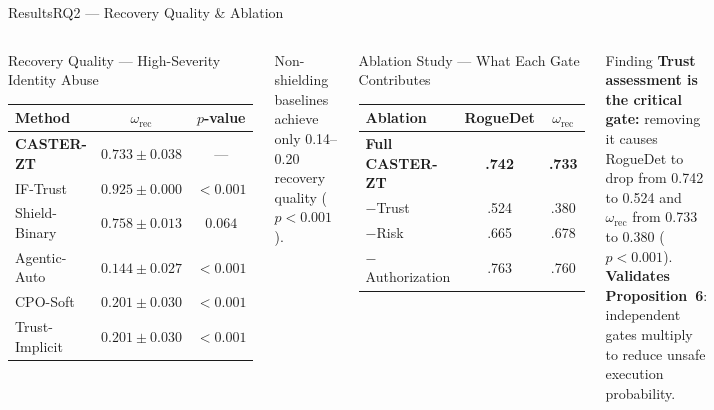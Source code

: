 \documentclass[aspectratio=169,10pt]{beamer}
\begin{document}
\begin{frame}[t,shrink=18]{Results}{RQ2 — Recovery Quality \& Ablation}
  \begin{columns}[t]
    \begin{block}{Recovery Quality — High-Severity Identity Abuse}
      \footnotesize
      \renewcommand{\arraystretch}{1.2}
      \begin{tabular}{@{}lcc@{}}
        \toprule
        \textbf{Method} & $\omega_\text{rec}$ & $p$-value \\
        \midrule
        \textbf{CASTER-ZT} & $\mathbf{0.733 \pm 0.038}$ & --- \\
        IF-Trust & $0.925 \pm 0.000$ & ${<}0.001$ \\
        Shield-Binary & $0.758 \pm 0.013$ & $0.064$ \\
        Agentic-Auto & $0.144 \pm 0.027$ & ${<}0.001$ \\
        CPO-Soft & $0.201 \pm 0.030$ & ${<}0.001$ \\
        Trust-Implicit & $0.201 \pm 0.030$ & ${<}0.001$ \\
        \bottomrule
      \end{tabular}
    \end{block}
    \vspace{0.2cm}
    {\footnotesize Non-shielding baselines achieve only 0.14–0.20 recovery quality ($p{<}0.001$).}
    \begin{alertblock}{Ablation Study — What Each Gate Contributes}
      \footnotesize
      \renewcommand{\arraystretch}{1.2}
      \begin{tabular}{@{}lcc@{}}
        \toprule
        \textbf{Ablation} & \textbf{RogueDet} & $\omega_\text{rec}$ \\
        \midrule
        \textbf{Full CASTER-ZT} & \textbf{.742} & \textbf{.733} \\
        $-$Trust & .524 & .380 \\
        $-$Risk & .665 & .678 \\
        $-$Authorization & .763 & .760 \\
        \bottomrule
      \end{tabular}
    \end{alertblock}
    \vspace{0.2cm}
    \begin{exampleblock}{Finding}
      \footnotesize \textbf{Trust assessment is the critical gate:} removing it causes RogueDet to drop from 0.742 to 0.524 and $\omega_\text{rec}$ from 0.733 to 0.380 ($p{<}0.001$).\\
      \textbf{Validates Proposition~6}: independent gates multiply to reduce unsafe execution probability.
    \end{exampleblock}
  \end{columns}
\end{frame}
\end{document}
